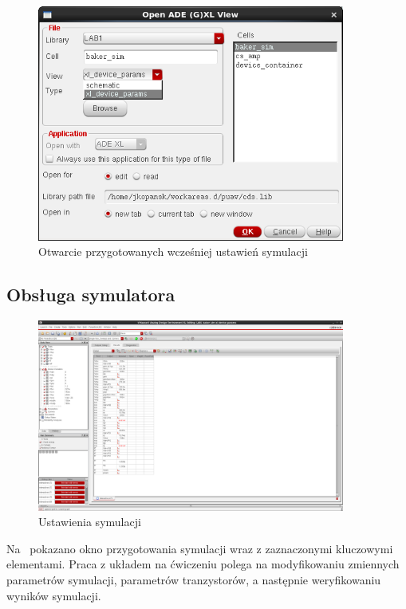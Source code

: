 \documentclass[twoside,pl,final]{labman}
\begin{document}
\begin{figure}[!htbp]
  \centering
  \includegraphics[width=0.9\textwidth]{adexl_open}
  \caption{Otwarcie przygotowanych wcześniej ustawień symulacji}
  \label{fig:measure:adexl_open}
\end{figure}

\subsection{Obsługa symulatora}
\label{measure:virtuoso:sim}

\begin{figure}[!htbp]
  \centering
  \includegraphics[angle=90,width=0.9\textwidth]{baker_adexl}
  \caption{Ustawienia symulacji}
  \label{fig:measure:baker_adexl}
\end{figure}

Na~ pokazano okno przygotowania symulacji
wraz z zaznaczonymi kluczowymi elementami.
Praca z układem na ćwiczeniu polega na modyfikowaniu zmiennych parametrów symulacji,
parametrów tranzystorów, a następnie weryfikowaniu wyników symulacji.
\end{document}
